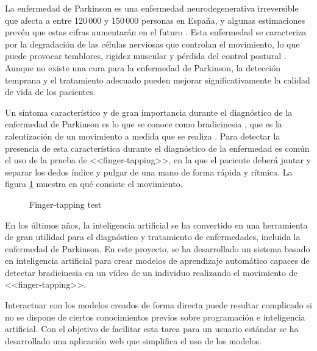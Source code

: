 \label{cha:Introducción}

La enfermedad de Parkinson es una enfermedad neurodegenerativa irreversible que
afecta a entre 120\,000 y 150\,000 personas en España, \cite{santos2021present}
y algunas estimaciones prevén que estas cifras aumentarán en el futuro
\cite{sen2021futuro}. Esta enfermedad se caracteriza por la degradación de las
células nerviosas que controlan el movimiento, lo que puede provocar temblores,
rigidez muscular y pérdida del control postural \cite{eswiki:148845196}. Aunque
no existe una cura para la enfermedad de Parkinson, la detección temprana y el
tratamiento adecuado pueden mejorar significativamente la calidad de vida de los
pacientes.

Un síntoma característico y de gran importancia durante el diagnóstico de la
enfermedad de Parkinson es lo que se conoce como bradicinesia
\cite{postuma2015mds}, que es la ralentización de un movimiento a medida que se
realiza \cite{berardelli2001pathophysiology}. Para detectar la presencia de esta
característica durante el diagnóstico de la enfermedad es común el uso de la
prueba de <<finger-tapping>>, en la que el paciente deberá juntar y separar los
dedos índice y pulgar de una mano de forma rápida y rítmica. La figura
\ref{fig:finger-tapping-test} muestra en qué consiste el movimiento.

\begin{figure}[H]
    \centering
    \caption{Finger-tapping test}
    \label{fig:finger-tapping-test}
\end{figure}

En los últimos años, la inteligencia artificial se ha convertido en una
herramienta de gran utilidad para el diagnóstico y tratamiento de enfermedades,
incluida la enfermedad de Parkinson. En este proyecto, se ha desarrollado un
sistema basado en inteligencia artificial para crear modelos de aprendizaje
automático capaces de detectar bradicinesia en un vídeo de un individuo
realizando el movimiento de <<finger-tapping>>.

Interactuar con los modelos creados de forma directa puede resultar complicado
si no se dispone de ciertos conocimientos previos sobre programación e
inteligencia artificial. Con el objetivo de facilitar esta tarea para un usuario
estándar se ha desarrollado una aplicación web que simplifica el uso de los
modelos.


